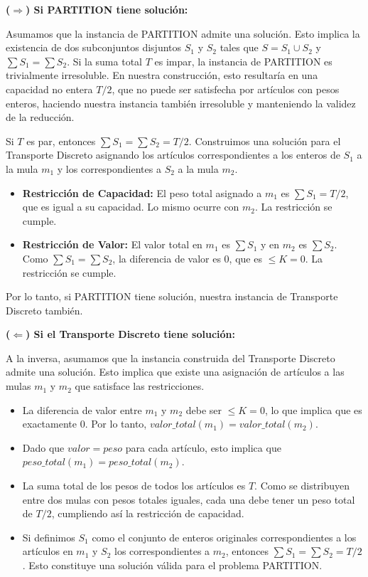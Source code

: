 \documentclass[12pt, a4paper]{article}
\begin{document}
    \textbf{($\Rightarrow$) Si PARTITION tiene solución:}

    Asumamos que la instancia de PARTITION admite una solución. Esto implica la existencia de dos subconjuntos disjuntos $S_1$ y $S_2$ tales que $S = S_1 \cup S_2$ y $\sum S_1 = \sum S_2$. Si la suma total $T$ es impar, la instancia de PARTITION es trivialmente irresoluble. En nuestra construcción, esto resultaría en una capacidad no entera $T/2$, que no puede ser satisfecha por artículos con pesos enteros, haciendo nuestra instancia también irresoluble y manteniendo la validez de la reducción.

    Si $T$ es par, entonces $\sum S_1 = \sum S_2 = T/2$. Construimos una solución para el Transporte Discreto asignando los artículos correspondientes a los enteros de $S_1$ a la mula $m_1$ y los correspondientes a $S_2$ a la mula $m_2$.

    \begin{itemize}
        \item \textbf{Restricción de Capacidad:} El peso total asignado a $m_1$ es $\sum S_1 = T/2$, que es igual a su capacidad. Lo mismo ocurre con $m_2$. La restricción se cumple.
        \item \textbf{Restricción de Valor:} El valor total en $m_1$ es $\sum S_1$ y en $m_2$ es $\sum S_2$. Como $\sum S_1 = \sum S_2$, la diferencia de valor es 0, que es $\leq K=0$. La restricción se cumple.
    \end{itemize}

    Por lo tanto, si PARTITION tiene solución, nuestra instancia de Transporte Discreto también.

    \textbf{($\Leftarrow$) Si el Transporte Discreto tiene solución:}

    A la inversa, asumamos que la instancia construida del Transporte Discreto admite una solución. Esto implica que existe una asignación de artículos a las mulas $m_1$ y $m_2$ que satisface las restricciones.

    \begin{itemize}
        \item La diferencia de valor entre $m_1$ y $m_2$ debe ser $\leq K=0$, lo que implica que es exactamente 0. Por lo tanto, $valor\_total(m_1) = valor\_total(m_2)$.
        \item Dado que $valor = peso$ para cada artículo, esto implica que $peso\_total(m_1) = peso\_total(m_2)$.
        \item La suma total de los pesos de todos los artículos es $T$. Como se distribuyen entre dos mulas con pesos totales iguales, cada una debe tener un peso total de $T/2$, cumpliendo así la restricción de capacidad.
        \item Si definimos $S_1$ como el conjunto de enteros originales correspondientes a los artículos en $m_1$ y $S_2$ los correspondientes a $m_2$, entonces $\sum S_1 = \sum S_2 = T/2$. Esto constituye una solución válida para el problema PARTITION.
    \end{itemize}
\end{document}
